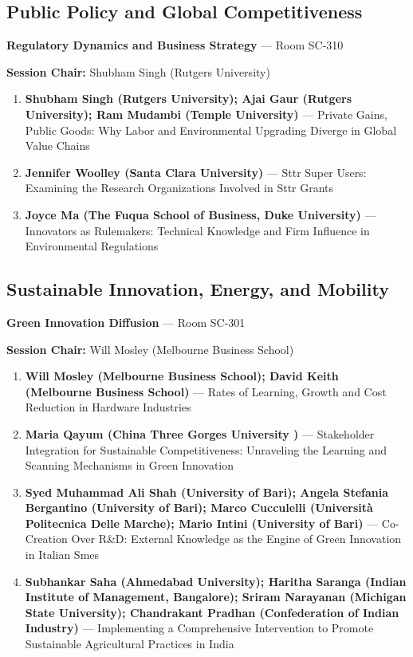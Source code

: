 \documentclass[
  10pt,
  letterpaper,
  DIV=11,
  numbers=noendperiod]{scrartcl}
\begin{document}
\subsection{\texorpdfstring{\textcolor{policy}{Public Policy and Global Competitiveness}}{}}\label{section-26}

\textbf{Regulatory Dynamics and Business Strategy} --- Room SC-310

\textbf{Session Chair:} Shubham Singh (Rutgers University)

\begin{enumerate}
\def\labelenumi{\arabic{enumi}.}
\item
  \textbf{Shubham Singh (Rutgers University); Ajai Gaur (Rutgers
  University); Ram Mudambi (Temple University)} --- Private Gains,
  Public Goods: Why Labor and Environmental Upgrading Diverge in Global
  Value Chains
\item
  \textbf{Jennifer Woolley (Santa Clara University)} --- Sttr Super
  Users: Examining the Research Organizations Involved in Sttr Grants
\item
  \textbf{Joyce Ma (The Fuqua School of Business, Duke University)} ---
  Innovators as Rulemakers: Technical Knowledge and Firm Influence in
  Environmental Regulations
\end{enumerate}

\subsection{\texorpdfstring{\textcolor{sustainability}{Sustainable Innovation, Energy, and Mobility}}{}}\label{section-27}

\textbf{Green Innovation Diffusion} --- Room SC-301

\textbf{Session Chair:} Will Mosley (Melbourne Business School)

\begin{enumerate}
\def\labelenumi{\arabic{enumi}.}
\item
  \textbf{Will Mosley (Melbourne Business School); David Keith
  (Melbourne Business School)} --- Rates of Learning, Growth and Cost
  Reduction in Hardware Industries
\item
  \textbf{Maria Qayum (China Three Gorges University )} --- Stakeholder
  Integration for Sustainable Competitiveness: Unraveling the Learning
  and Scanning Mechanisms in Green Innovation
\item
  \textbf{Syed Muhammad Ali Shah (University of Bari); Angela Stefania
  Bergantino (University of Bari); Marco Cucculelli (Università
  Politecnica Delle Marche); Mario Intini (University of Bari)} ---
  Co-Creation Over R\&D: External Knowledge as the Engine of Green
  Innovation in Italian Smes
\item
  \textbf{Subhankar Saha (Ahmedabad University); Haritha Saranga (Indian
  Institute of Management, Bangalore); Sriram Narayanan (Michigan State
  University); Chandrakant Pradhan (Confederation of Indian Industry)}
  --- Implementing a Comprehensive Intervention to Promote Sustainable
  Agricultural Practices in India
\end{enumerate}
\end{document}
